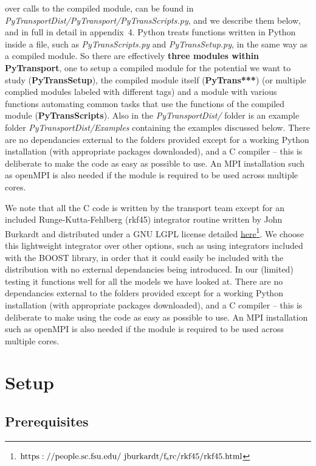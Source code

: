 \documentclass[10pt,
amsmath,amssymb,
aps,prd,nofootinbib,eqsecnum,a4paper]{revtex4}
\newcommand{\CC}{C\nolinebreak\hspace{-.05em}\raisebox{.4ex}{\tiny\bf +}\nolinebreak\hspace{-.10em}\raisebox{.4ex}{\tiny\bf +}}
\def\CC{{C\nolinebreak[4]\hspace{-.05em}\raisebox{.4ex}{\tiny\bf ++}}}
\def\S{ }
\begin{document}
over calls to the compiled module, can be 
found in {\it PyTransportDist/PyTransport/PyTransScripts.py}, and we describe them below, and in full in detail in appendix~4. 
Python 
treats functions written in Python inside a file, such as {\it PyTransScripts.py} and {\it PyTransSetup.py}, 
in the same way as a compiled module. 
So there are effectively {\bf three modules within PyTransport}, 
one to setup a compiled module for the potential we want to study ({\bf PyTransSetup}), the compiled module itself ({\bf PyTrans***}) 
(or multiple complied modules labeled with different tags) and a 
module with various functions automating common tasks that 
use the functions of the compiled module ({\bf PyTransScripts}). 
Also in the {\it PyTransportDist/} folder is an example folder {\it PyTransportDist/Examples} 
containing the examples discussed below. 
There are no dependancies external to the folders provided except for a working Python 
installation (with appropriate packages downloaded), and a \CC \S compiler -- this is deliberate to make 
the code as easy as possible to use.
An MPI installation such as openMPI is also needed if the module is required to be 
used across multiple cores. 



We note that all the \CC \S  code is written by the transport team except for an included Runge-Kutta-Fehlberg (rkf45)
integrator routine written by John Burkardt and distributed under a GNU LGPL license detailed \href{https://people.sc.fsu.edu/~jburkardt/f_src/rkf45/rkf45.html}{here}\footnote{$\rm https://people.sc.fsu.edu/~jburkardt/f_src/rkf45/rkf45.html$}.  We choose this lightweight integrator over other options, such as using integrators included with 
the BOOST library, in order that it could easily be included with the distribution with no external dependancies being introduced. 
In our (limited) testing it functions well for all the models we have looked at.
There are no dependancies external to the folders provided except for a working Python 
installation (with appropriate packages downloaded), and a \CC \S compiler -- this is deliberate to make 
using the code as easy as possible to use.
An MPI installation such as openMPI is also needed if the module is required to be 
used across multiple cores. 

\section{Setup}
\label{Setup}

\subsection {Prerequisites} 
\end{document}
